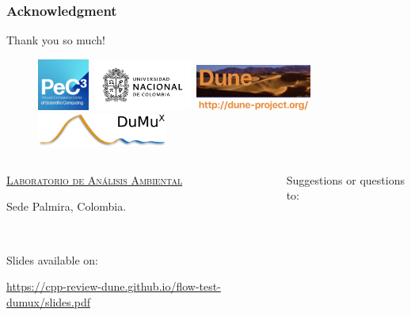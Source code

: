 \begin{frame}
	\frametitle{Acknowledgment}
	\begin{center}\Huge
		Thank you so much!
	\end{center}
	\begin{figure}[ht!]
		\centering
		\href{https://www.pec3.org}{\includegraphics[height=1.7cm]{pec3}}\,
		\href{https://unal.edu.co}{\includegraphics[height=1.7cm]{unal}}\,
		\href{https://dune-project.org}{\includegraphics[height=1.5cm]{dune-logo}}\,
		\href{https://dumux.org}{\includegraphics[height=1.1cm]{dumux}}
	\end{figure}
	\vfill
	\begin{columns}
		\begin{column}{0.5\textwidth}
			\textcolor{c++reviewduneblue!50!c++reviewduneverde}{\href{https://laboratorios.unal.edu.co/geslab2021/servicios-lab-unal/labs-palmira}{\textsc{Laboratorio de Análisis Ambiental}}}

			Sede Palmira, Colombia.

			\

			\textcolor{c++reviewduneblue}{Slides available on:}
			\begin{center}
				\href{https://cpp-review-dune.github.io/flow-test-dumux/slides.pdf}{\url{https://cpp-review-dune.github.io/flow-test-dumux/slides.pdf}}
			\end{center}
		\end{column}
		\hfill
		\begin{column}{0.5\textwidth}
			\begin{flushright}
				Suggestions or questions to:


\end{flushright}
\end{column}
\end{columns}
\end{frame}
